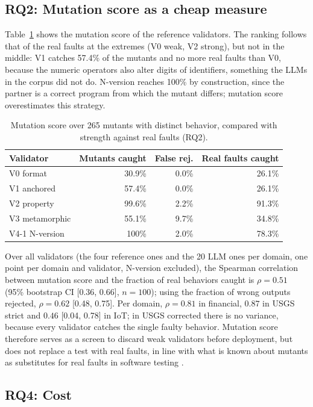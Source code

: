 \documentclass[sigconf,nonacm]{acmart}
\begin{document}
\subsection{RQ2: Mutation score as a cheap measure}

Table~\ref{tab:rq2} shows the mutation score of the reference validators. The ranking follows that of the real faults at the extremes (V0 weak, V2 strong), but not in the middle: V1 catches 57.4\% of the mutants and no more real faults than V0, because the numeric operators also alter digits of identifiers, something the LLMs in the corpus did not do. N-version reaches 100\% by construction, since the partner is a correct program from which the mutant differs; mutation score overestimates this strategy.

\begin{table}[t]
\caption{Mutation score over 265 mutants with distinct behavior, compared with strength against real faults (RQ2).}
\label{tab:rq2}
\small
\begin{tabular}{lrrr}
\toprule
Validator & Mutants caught & False rej. & Real faults caught \\
\midrule
V0 format & 30.9\% & 0.0\% & 26.1\% \\
V1 anchored & 57.4\% & 0.0\% & 26.1\% \\
V2 property & 99.6\% & 2.2\% & 91.3\% \\
V3 metamorphic & 55.1\% & 9.7\% & 34.8\% \\
V4-1 N-version & 100\% & 2.0\% & 78.3\% \\
\bottomrule
\end{tabular}
\end{table}

Over all validators (the four reference ones and the 20 LLM ones per domain, one point per domain and validator, N-version excluded), the Spearman correlation between mutation score and the fraction of real behaviors caught is $\rho = 0.51$ (95\% bootstrap CI [0.36, 0.66], $n = 100$); using the fraction of wrong outputs rejected, $\rho = 0.62$ [0.48, 0.75]. Per domain, $\rho = 0.81$ in financial, $0.87$ in USGS strict and $0.46$ [0.04, 0.78] in IoT; in USGS corrected there is no variance, because every validator catches the single faulty behavior. Mutation score therefore serves as a screen to discard weak validators before deployment, but does not replace a test with real faults, in line with what is known about mutants as substitutes for real faults in software testing \cite{just2014mutants}.

\subsection{RQ4: Cost}
\end{document}
